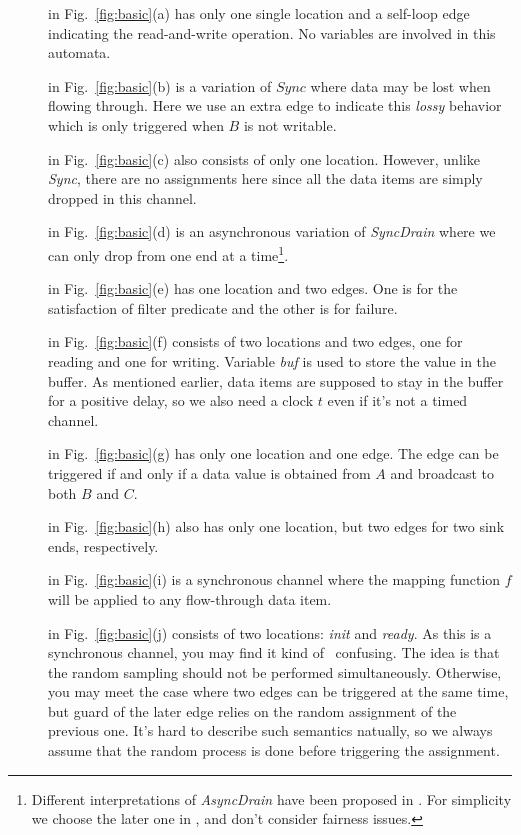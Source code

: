 \begin{description}
    \item[] in Fig.~\ref{fig:basic}(a) has only one single location and a self-loop edge indicating the read-and-write operation. No variables are involved in this automata.
    \item[] in Fig.~\ref{fig:basic}(b) is a variation of $Sync$ where data may be lost when flowing through. Here we use an extra edge to indicate this \emph{lossy} behavior which is only triggered when $B$ is not writable.
    \item[] in Fig.~\ref{fig:basic}(c) also consists of only one location. However, unlike \emph{Sync}, there are no assignments here since all the data items are simply dropped in this channel.
    \item[] in Fig.~\ref{fig:basic}(d) is an asynchronous variation of \emph{SyncDrain} where we can only drop from one end at a time\footnote{Different interpretations of \emph{AsyncDrain} have been proposed in \cite{ARBAB2004,Baier2006a}. For simplicity we choose the later one in \cite{Baier2006a}, and don't consider fairness issues.}.
    \item[] in Fig.~\ref{fig:basic}(e) has one location and two edges. One is for the satisfaction of filter predicate and the other is for failure.
    \item[] in Fig.~\ref{fig:basic}(f) consists of two locations and two edges, one for reading and one for writing. Variable \emph{buf} is used to store the value in the buffer. As mentioned earlier, data items are supposed to stay in the buffer for a positive delay, so we also need a clock $t$ even if it's not a timed channel.
    \item[] in Fig.~\ref{fig:basic}(g) has only one location and one edge. The edge can be triggered if and only if a data value is obtained from $A$ and broadcast to both $B$ and $C$.
    \item[] in Fig.~\ref{fig:basic}(h) also has only one location, but two edges for two sink ends, respectively.
    \item[] in Fig.~\ref{fig:basic}(i) is a synchronous channel where the mapping function $f$ will be applied to any flow-through data item.
    \item[] in Fig.~\ref{fig:basic}(j) consists of two locations: \emph{init} and \emph{ready}. As this is a synchronous channel, you may find it kind of  confusing. The idea is that the random sampling should not be performed simultaneously. Otherwise, you may meet the case where two edges can be triggered at the same time, but guard of the later edge relies on the random assignment of the previous one. It's hard to describe such semantics natually, so we always assume that the random process is done before triggering the assignment.



\end{description}
